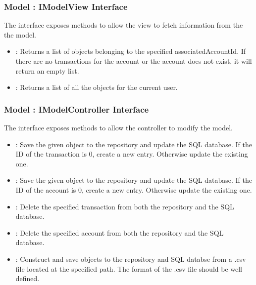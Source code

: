 \documentclass[12pt]{article}
\begin{document}
\subsubsection{Model : IModelView Interface}
The  interface exposes methods to allow the view to fetch information from the the model.\\
\begin{itemize}
	\item {} : Returns a list of  objects belonging to the specified associatedAccountId. If there are no transactions for the account or the account does not exist, it will return an empty list.
	\item {} : Returns a list of all the  objects for the current user.
\end{itemize}

\subsubsection{Model : IModelController Interface}
The  interface exposes methods to allow the controller to modify the model.\\
\begin{itemize}
	\item {} : Save the given  object to the repository and update the SQL database. If the ID of the transaction is 0, create a new entry. Otherwise update the existing one.
	\item {} : Save the given  object to the repository and update the SQL database. If the ID of the account is 0, create a new entry. Otherwise update the existing one.
	\item {} : Delete the specified transaction from both the repository and the SQL database.
	\item {} : Delete the specified account from both the repository and the SQL database.
	\item {} : Construct and save  objects to the repository and SQL databse from a .csv file located at the specified path. The format of the .csv file should be well defined.
\end{itemize}
\end{document}
